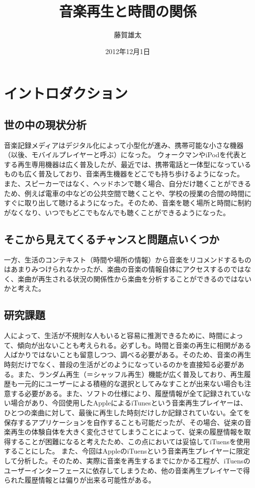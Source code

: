 \documentclass{jsarticle}
\begin{document}
\title{音楽再生と時間の関係}
\author{藤賀雄太}
\date{2012年12月1日}
\maketitle

\section{イントロダクション}
\subsection{世の中の現状分析}
音楽記録メディアはデジタル化によって小型化が進み、携帯可能な小さな機器（以後、モバイルプレイヤーと呼ぶ）になった。
ウォークマンやiPodを代表とする再生専用機器は広く普及したが、最近では、携帯電話と一体型になっているものも広く普及しており、音楽再生機器をどこでも持ち歩けるようになった。
また、スピーカーではなく、ヘッドホンで聴く場合、自分だけ聴くことができるため、例えば電車の中などの公共空間で聴くことや、学校の授業の合間の時間にすぐに取り出して聴けるようになった。そのため、音楽を聴く場所と時間に制約がなくなり、いつでもどこでもなんでも聴くことができるようになった。


\subsection{そこから見えてくるチャンスと問題点いくつか}
一方、生活のコンテキスト（時間や場所の情報）から音楽をリコメンドするものはあまりみつけられなかったが、楽曲の音楽の情報自体にアクセスするのではなく、楽曲が再生される状況の関係性から楽曲を分析することができるのではないかと考えた。
\subsection{研究課題}
人によって、生活が不規則な人もいると容易に推測できるために、時間によって、傾向が出ないことも考えられる。必ずしも。時間と音楽の再生に相関がある人ばかりではないことも留意しつつ、調べる必要がある。そのため、音楽の再生時刻だけでなく、普段の生活がどのようになっているのかを直接知る必要がある。また、ランダム再生（＝シャッフル再生）機能が広く普及しており、再生履歴も一元的にユーザーによる積極的な選択としてみなすことが出来ない場合も注意する必要がある。また、ソフトの仕様により、履歴情報が全て記録されていない場合があり、今回使用したAppleによるiTunesという音楽再生プレイヤーは、ひとつの楽曲に対して、最後に再生した時刻だけしか記録されていない。全てを保存するアプリケーションを自作することも可能だったが、その場合、従来の音楽再生の体験自体を大きく変化させてしまうことによって、従来の履歴情報を取得することが困難になると考えたため、この点においては妥協してiTuensを使用することにした。
また、今回はAppleのiTuensという音楽再生プレイヤーに限定して分析した。そのため、実際に音楽を再生するまでにかかる工程が、iTuensのユーザーインターフェースに依存してしまうため、他の音楽再生プレイヤーで得られた履歴情報とは偏りが出来る可能性がある。
\end{document}
